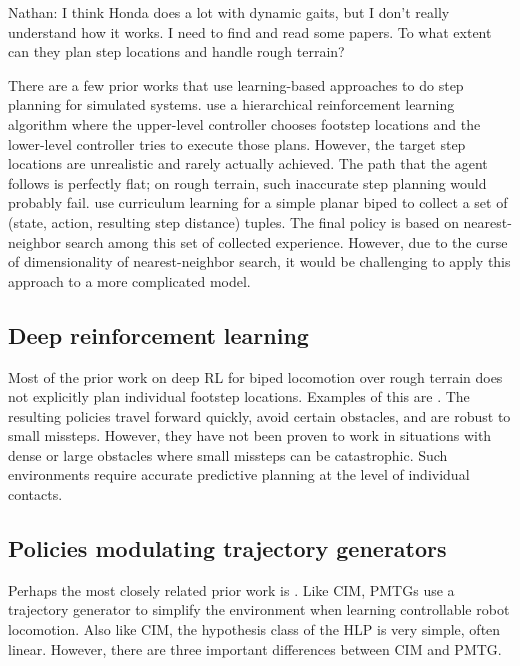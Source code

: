 \documentclass[a4paper]{article}
\newcommand{\nhatch}[1]{{\leavevmode\color{blue} Nathan: #1}}
\begin{document}
\nhatch{I think Honda does a lot with dynamic gaits, but I don't really understand how it works. I need to find and read some papers. To what extent can they plan step locations and handle rough terrain?}

There are a few prior works that use learning-based approaches to do step planning for simulated systems.
\cite{peng2017deeploco} use a hierarchical reinforcement learning algorithm where the upper-level controller chooses footstep locations and the lower-level controller tries to execute those plans.
However, the target step locations are unrealistic and rarely actually achieved.
The path that the agent follows is perfectly flat; on rough terrain, such inaccurate step planning would probably fail.
\cite{karpathy2012curriculum} use curriculum learning for a simple planar biped to collect a set of (state, action, resulting step distance) tuples.
The final policy is based on nearest-neighbor search among this set of collected experience.
However, due to the curse of dimensionality of nearest-neighbor search,
it would be challenging to apply this approach to a more complicated model.

\subsection{Deep reinforcement learning}

Most of the prior work on deep RL for biped locomotion over rough terrain does not explicitly plan individual footstep locations.
Examples of this are \cite{peng2018deepmimic, heess2017emergence, peng2016terrain}. The resulting policies travel forward quickly, avoid certain obstacles, and are robust to small missteps.
However, they have not been proven to work in situations with dense or large obstacles where small missteps can be catastrophic.
Such environments require accurate predictive planning at the level of individual contacts.

\subsection{Policies modulating trajectory generators}

Perhaps the most closely related prior work is \citet{iscen2018pmtg}.
Like CIM, PMTGs use a trajectory generator to simplify the environment when learning controllable robot locomotion.
Also like CIM, the hypothesis class of the HLP is very simple, often linear.
However, there are three important differences between CIM and PMTG.
\end{document}
